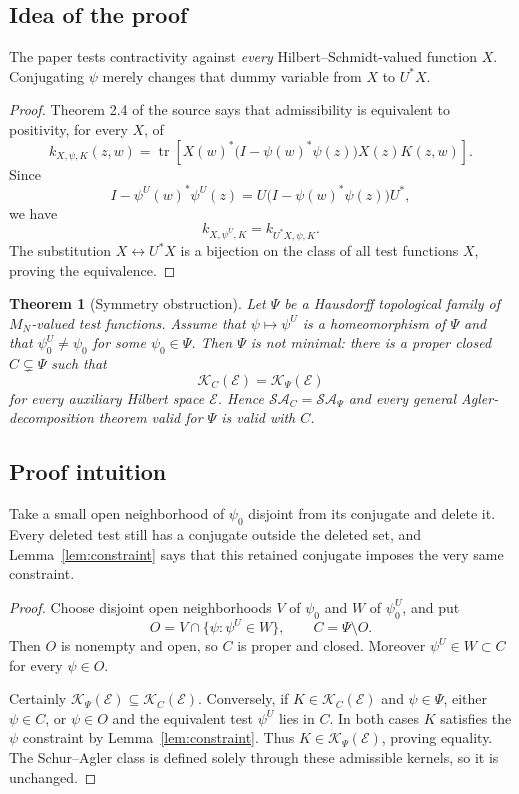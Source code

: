 \documentclass[11pt]{article}
\newtheorem{theorem}{Theorem}
\newcommand{\K}{\mathcal K}
\newcommand{\SA}{\mathcal{SA}}
\begin{document}
\subsection*{Idea of the proof}

The paper tests contractivity against \emph{every} Hilbert--Schmidt-valued
function $X$.  Conjugating $\psi$ merely changes that dummy variable from
$X$ to $U^*X$.

\begin{proof}
Theorem 2.4 of the source says that admissibility is equivalent to positivity,
for every $X$, of
\begin{equation}\label{eq:testkernel}
 k_{X,\psi,K}(z,w)=\operatorname{tr}\!\left[
 X(w)^*\bigl(I-\psi(w)^*\psi(z)\bigr)X(z)K(z,w)\right].
\end{equation}
Since
\[
 I-\psi^U(w)^*\psi^U(z)
   =U\bigl(I-\psi(w)^*\psi(z)\bigr)U^*,
\]
we have
\[
                 k_{X,\psi^U,K}=k_{U^*X,\psi,K}.
\]
The substitution $X\leftrightarrow U^*X$ is a bijection on the class of all
test functions $X$, proving the equivalence.
\end{proof}

\begin{theorem}[Symmetry obstruction]\label{thm:symmetry}
Let $\Psi$ be a Hausdorff topological family of $M_N$-valued test functions.
Assume that $\psi\mapsto\psi^U$ is a homeomorphism of $\Psi$ and that
$\psi_0^U\ne\psi_0$ for some $\psi_0\in\Psi$.  Then $\Psi$ is not minimal:
there is a proper closed $C\subsetneq\Psi$ such that
\[
             \K_C(\mathcal E)=\K_\Psi(\mathcal E)
\]
for every auxiliary Hilbert space $\mathcal E$.  Hence
$\SA_C=\SA_\Psi$ and every general Agler-decomposition theorem valid for
$\Psi$ is valid with $C$.
\end{theorem}

\subsection*{Proof intuition}

Take a small open neighborhood of $\psi_0$ disjoint from its conjugate and
delete it.  Every deleted test still has a conjugate outside the deleted
set, and Lemma~\ref{lem:constraint} says that this retained conjugate imposes
the very same constraint.

\begin{proof}
Choose disjoint open neighborhoods $V$ of $\psi_0$ and $W$ of $\psi_0^U$,
and put
\[
 O=V\cap\{\psi:\psi^U\in W\},\qquad C=\Psi\setminus O.
\]
Then $O$ is nonempty and open, so $C$ is proper and closed.  Moreover
$\psi^U\in W\subset C$ for every $\psi\in O$.

Certainly $\K_\Psi(\mathcal E)\subseteq\K_C(\mathcal E)$.  Conversely, if
$K\in\K_C(\mathcal E)$ and $\psi\in\Psi$, either $\psi\in C$, or
$\psi\in O$ and the equivalent test $\psi^U$ lies in $C$.  In both cases
$K$ satisfies the $\psi$ constraint by Lemma~\ref{lem:constraint}.  Thus
$K\in\K_\Psi(\mathcal E)$, proving equality.  The Schur--Agler class is
defined solely through these admissible kernels, so it is unchanged.
\end{proof}
\end{document}
